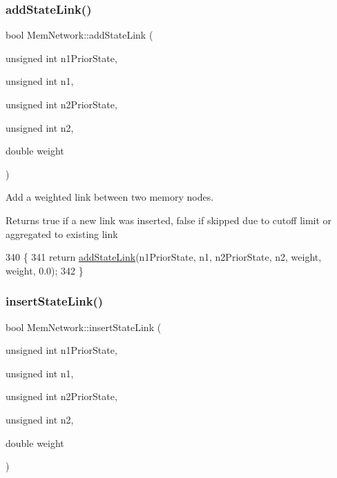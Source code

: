 \subsubsection{\texorpdfstring{add\+State\+Link()}{addStateLink()}}
{\footnotesize\ttfamily bool Mem\+Network\+::add\+State\+Link (\begin{DoxyParamCaption}\item[{unsigned int}]{n1\+Prior\+State,  }\item[{unsigned int}]{n1,  }\item[{unsigned int}]{n2\+Prior\+State,  }\item[{unsigned int}]{n2,  }\item[{double}]{weight }\end{DoxyParamCaption})\hspace{0.3cm}{\ttfamily [inline]}}

Add a weighted link between two memory nodes. \begin{DoxyReturn}{Returns}
true if a new link was inserted, false if skipped due to cutoff limit or aggregated to existing link 
\end{DoxyReturn}

\begin{DoxyCode}
340 \{
341     \textcolor{keywordflow}{return} \mbox{\hyperlink{classMemNetwork_aed51978dfece1214f4fa9ea2bfebc492}{addStateLink}}(n1PriorState, n1, n2PriorState, n2, weight, weight, 0.0);
342 \}
\end{DoxyCode}
\mbox{\label{classMemNetwork_a57ed428085242fe3d0538a97f52f174d}} 
\subsubsection{\texorpdfstring{insert\+State\+Link()}{insertStateLink()}}
{\footnotesize\ttfamily bool Mem\+Network\+::insert\+State\+Link (\begin{DoxyParamCaption}\item[{unsigned int}]{n1\+Prior\+State,  }\item[{unsigned int}]{n1,  }\item[{unsigned int}]{n2\+Prior\+State,  }\item[{unsigned int}]{n2,  }\item[{double}]{weight }\end{DoxyParamCaption})\hspace{0.3cm}{\ttfamily [protected]}}

